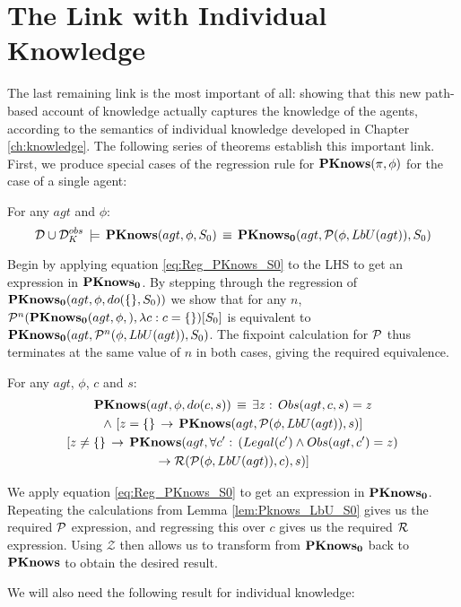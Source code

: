 \section{The Link with Individual Knowledge\label{sec:CKnowledge:Correctness}}

The last remaining link is the most important of all: showing that
this new path-based account of knowledge actually captures the knowledge
of the agents, according to the semantics of individual knowledge
developed in Chapter \ref{ch:knowledge}. The following series of
theorems establish this important link. First, we produce special
cases of the regression rule for $\mathbf{PKnows}(\pi,\phi)$ for the case
of a single agent:

\begin{lemma}
\label{lem:Pknows_LbU_S0}For any $agt$ and $\phi$:\[
\mathcal{D}\cup\mathcal{D}_{K}^{obs}\,\models\,\mathbf{PKnows}(agt,\phi,S_{0})\,\equiv\,\mathbf{PKnows_{0}}(agt,\mathcal{P}(\phi,LbU(agt)),S_{0})\]

\end{lemma}
\begin{proofsketch}
Begin by applying equation \eqref{eq:Reg_PKnows_S0} to the LHS to
get an expression in $\mathbf{PKnows_{0}}$. By stepping through the regression
of $\mathbf{PKnows_{0}}(agt,\phi,do(\{\},S_{0}))$ we show that for any $n$,
$\mathcal{P}^{n}(\mathbf{PKnows_{0}}(agt,\phi,),\lambda c:c=\{\})[S_{0}]$ is equivalent
to $\mathbf{PKnows_{0}}(agt,\mathcal{P}^{n}(\phi,LbU(agt)),S_{0})$. The fixpoint calculation
for $\mathcal{P}$ thus terminates at the same value of $n$ in both cases,
giving the required equivalence. 
\end{proofsketch}
\begin{lemma}
\label{lem:Pknows_LbU_do}For any $agt$, $\phi$, $c$ and $s$:\begin{multline*}
\mathbf{PKnows}(agt,\phi,do(c,s))\,\equiv\,\exists z:\, Obs(agt,c,s)=z\\
\wedge\,\left[z=\{\}\,\rightarrow\,\mathbf{PKnows}(agt,\mathcal{P}(\phi,LbU(agt)),s)\right]\\
\left[z\neq\{\}\,\rightarrow\,\mathbf{PKnows}(agt,\forall c':\,\left(Legal(c')\wedge Obs(agt,c')=z\right)\right.\\
\left.\rightarrow\mathcal{R}(\mathcal{P}(\phi,LbU(agt)),c),s)\right]\end{multline*}

\end{lemma}
\begin{proofsketch}
We apply equation \eqref{eq:Reg_PKnows_S0} to get an expression in
$\mathbf{PKnows_{0}}$. Repeating the calculations from Lemma \ref{lem:Pknows_LbU_S0}
gives us the required $\mathcal{P}$ expression, and regressing this over
$c$ gives us the required $\mathcal{R}$ expression. Using $\mathcal{Z}$
then allows us to transform from $\mathbf{PKnows_{0}}$ back to $\mathbf{PKnows}$ to
obtain the desired result. 
\end{proofsketch}
We will also need the following result for individual knowledge:

